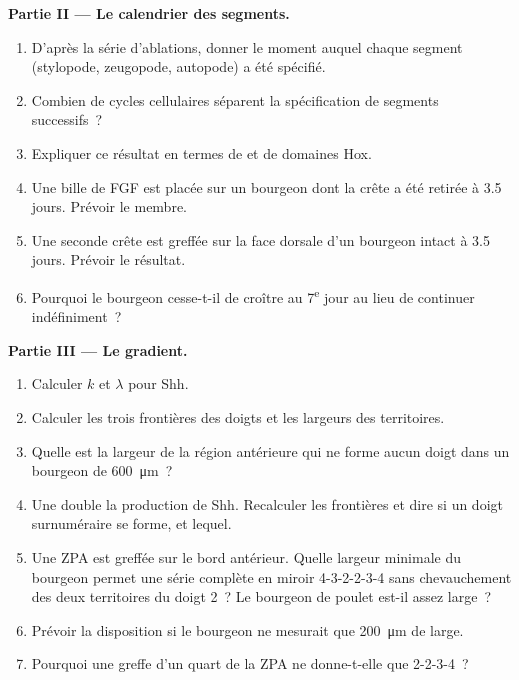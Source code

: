 \begin{problem}
\medskip
\noindent\textbf{Partie II --- Le calendrier des segments.}
\begin{enumerate}[resume]
  \item D'après la série d'ablations, donner le moment auquel chaque
        segment (stylopode, zeugopode, autopode) a été spécifié.
  \item Combien de cycles cellulaires séparent la spécification de
        segments successifs~?
  \item Expliquer ce résultat en termes de  et de
        domaines Hox.
  \item Une bille de FGF est placée sur un bourgeon dont la crête a été
        retirée à 3.5 jours. Prévoir le membre.
  \item Une seconde crête est greffée sur la face dorsale d'un bourgeon
        intact à 3.5 jours. Prévoir le résultat.
  \item Pourquoi le bourgeon cesse-t-il de croître au
        7\textsuperscript{e} jour au lieu de continuer indéfiniment~?
\end{enumerate}

\medskip
\noindent\textbf{Partie III --- Le gradient.}
\begin{enumerate}[resume]
  \item Calculer $k$ et $\lambda$ pour Shh.
  \item Calculer les trois frontières des doigts et les largeurs des
        territoires.
  \item Quelle est la largeur de la région antérieure qui ne forme aucun
        doigt dans un bourgeon de \qty{600}{\micro m}~?
  \item Une  double la production de Shh. Recalculer les
        frontières et dire si un doigt surnuméraire se forme, et lequel.
  \item Une ZPA est greffée sur le bord antérieur. Quelle largeur
        minimale du bourgeon permet une série complète en miroir
        4-3-2-2-3-4 sans chevauchement des deux territoires du doigt 2~?
        Le bourgeon de poulet est-il assez large~?
  \item Prévoir la disposition si le bourgeon ne mesurait que
        \qty{200}{\micro m} de large.
  \item Pourquoi une greffe d'un quart de la ZPA ne donne-t-elle que
        2-2-3-4~?
\end{enumerate}


\end{problem}
